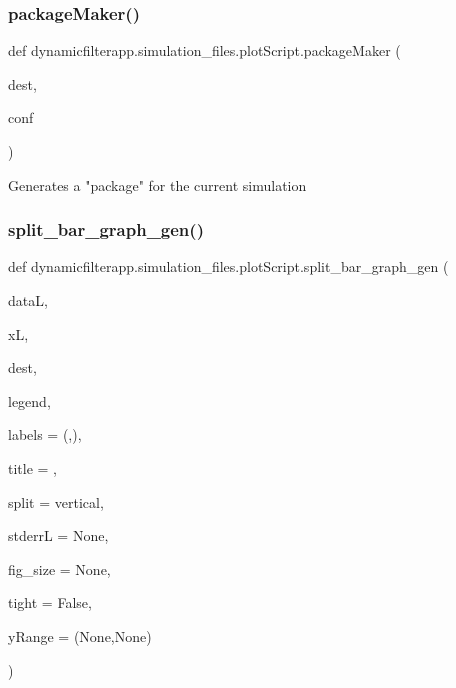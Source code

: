 \subsubsection{\texorpdfstring{package\+Maker()}{packageMaker()}}
{\footnotesize\ttfamily def dynamicfilterapp.\+simulation\+\_\+files.\+plot\+Script.\+package\+Maker (\begin{DoxyParamCaption}\item[{}]{dest,  }\item[{}]{conf }\end{DoxyParamCaption})}

\begin{DoxyVerb}Generates a "package" for the current simulation\end{DoxyVerb}
 \mbox{\label{namespacedynamicfilterapp_1_1simulation__files_1_1plot_script_a8ffea8a8a4ebae3175cfb4d73d7be756}} 
\subsubsection{\texorpdfstring{split\+\_\+bar\+\_\+graph\+\_\+gen()}{split\_bar\_graph\_gen()}}
{\footnotesize\ttfamily def dynamicfilterapp.\+simulation\+\_\+files.\+plot\+Script.\+split\+\_\+bar\+\_\+graph\+\_\+gen (\begin{DoxyParamCaption}\item[{}]{dataL,  }\item[{}]{xL,  }\item[{}]{dest,  }\item[{}]{legend,  }\item[{}]{labels = {\ttfamily (\textquotesingle{}\textquotesingle{},\textquotesingle{}\textquotesingle{})},  }\item[{}]{title = {\ttfamily \textquotesingle{}\textquotesingle{}},  }\item[{}]{split = {\ttfamily \textquotesingle{}vertical\textquotesingle{}},  }\item[{}]{stderrL = {\ttfamily None},  }\item[{}]{fig\+\_\+size = {\ttfamily None},  }\item[{}]{tight = {\ttfamily False},  }\item[{}]{y\+Range = {\ttfamily (None,None)} }\end{DoxyParamCaption})}


